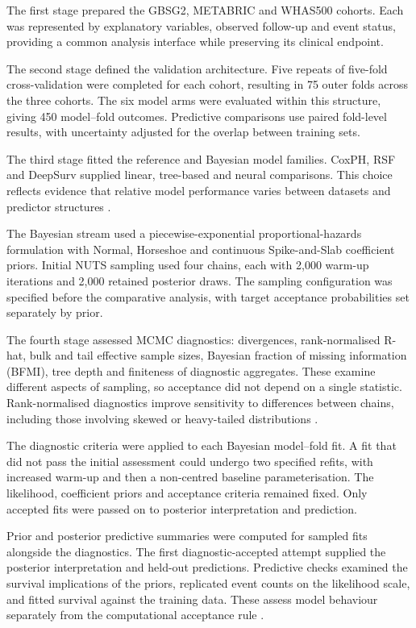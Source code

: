 The first stage prepared the GBSG2, METABRIC and WHAS500 cohorts. Each was represented by explanatory variables, observed follow-up and event status, providing a common analysis interface while preserving its clinical endpoint.

The second stage defined the validation architecture. Five repeats of five-fold cross-validation were completed for each cohort, resulting in 75 outer folds across the three cohorts. The six model arms were evaluated within this structure, giving 450 model--fold outcomes. Predictive comparisons use paired fold-level results, with uncertainty adjusted for the overlap between training sets.

The third stage fitted the reference and Bayesian model families. CoxPH, RSF and DeepSurv supplied linear, tree-based and neural comparisons. This choice reflects evidence that relative model performance varies between datasets and predictor structures \cite{ref4,ref33,ref37}.

The Bayesian stream used a piecewise-exponential proportional-hazards formulation with Normal, Horseshoe and continuous Spike-and-Slab coefficient priors. Initial NUTS sampling used four chains, each with 2,000 warm-up iterations and 2,000 retained posterior draws. The sampling configuration was specified before the comparative analysis, with target acceptance probabilities set separately by prior.

The fourth stage assessed MCMC diagnostics: divergences, rank-normalised R-hat, bulk and tail effective sample sizes, Bayesian fraction of missing information (BFMI), tree depth and finiteness of diagnostic aggregates. These examine different aspects of sampling, so acceptance did not depend on a single statistic. Rank-normalised diagnostics improve sensitivity to differences between chains, including those involving skewed or heavy-tailed distributions \cite{ref39}.

The diagnostic criteria were applied to each Bayesian model--fold fit. A fit that did not pass the initial assessment could undergo two specified refits, with increased warm-up and then a non-centred baseline parameterisation. The likelihood, coefficient priors and acceptance criteria remained fixed. Only accepted fits were passed on to posterior interpretation and prediction.

Prior and posterior predictive summaries were computed for sampled fits alongside the diagnostics. The first diagnostic-accepted attempt supplied the posterior interpretation and held-out predictions. Predictive checks examined the survival implications of the priors, replicated event counts on the likelihood scale, and fitted survival against the training data. These assess model behaviour separately from the computational acceptance rule \cite{ref22,ref53}.

